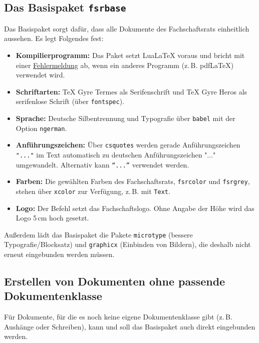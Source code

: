 \subsection{Das Basispaket \texttt{fsrbase}}
\label{latex-fsrbase}
Das Basispaket sorgt dafür, dass alle Dokumente des Fachschaftsrats einheitlich aussehen. Es legt Folgendes fest:
\begin{itemize}
	\item \textbf{Kompilierprogramm:} Das Paket setzt LuaLaTeX voraus und bricht mit einer \hyperref[latex-fehlermeldungen]{Fehlermeldung} ab, wenn ein anderes Programm (z.\,B. pdfLaTeX) verwendet wird.
\item \textbf{Schriftarten:} TeX Gyre Termes als Serifenschrift und TeX Gyre Heros als serifenlose Schrift (über \texttt{fontspec}).
	\item \textbf{Sprache:} Deutsche Silbentrennung und Typografie über \texttt{babel} mit der Option \texttt{ngerman}.
	\item \textbf{Anführungszeichen:} Über \texttt{csquotes} werden gerade Anführungszeichen \texttt{\string"...\string"} im Text automatisch zu deutschen Anführungszeichen "..." umgewandelt. Alternativ kann \texttt{\enquote{...}} verwendet werden.
	\item \textbf{Farben:} Die gewählten Farben des Fachschaftsrats, \texttt{fsrcolor} und \texttt{fsrgrey}, stehen über \texttt{xcolor} zur Verfügung, z.\,B. mit \texttt{\textcolor{fsrgrey}{Text}}.
	\item \textbf{Logo:} Der Befehl \texttt{\fsrlogo[Höhe]} setzt das Fachschaftslogo. Ohne Angabe der Höhe wird das Logo 5\,cm hoch gesetzt.
\end{itemize}

Außerdem lädt das Basispaket die Pakete \texttt{microtype} (bessere Typografie/Blocksatz) und \texttt{graphicx} (Einbinden von Bildern), die deshalb nicht erneut eingebunden werden müssen.

\subsection{Erstellen von Dokumenten ohne passende Dokumentenklasse}
\label{latex-ohne-dokumentenklasse}
Für Dokumente, für die es noch keine eigene Dokumentenklasse gibt (z.\,B. Aushänge oder Schreiben), kann und soll das Basispaket auch direkt eingebunden werden.


